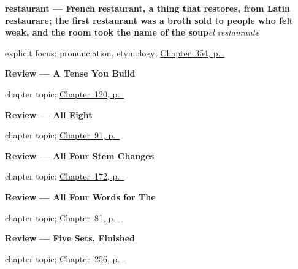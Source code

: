\noindent\begin{minipage}[t]{\linewidth}
\raggedright
\textbf{restaurant — French restaurant, a thing that restores, from Latin restaurare; the first restaurant was a broth sold to people who felt weak, and the room took the name of the soup}\enspace\emph{el restaurante}\par
\footnotesize explicit focus: pronunciation, etymology; \hyperref[ch:el-hotel-y-el-cine]{Chapter~354, p.~\pageref*{ch:el-hotel-y-el-cine}}
\end{minipage}\par\smallskip

\noindent\begin{minipage}[t]{\linewidth}
\raggedright
\textbf{Review --- A Tense You Build}\par
\footnotesize chapter topic; \hyperref[ch:review-perfect]{Chapter~120, p.~\pageref*{ch:review-perfect}}
\end{minipage}\par\smallskip

\noindent\begin{minipage}[t]{\linewidth}
\raggedright
\textbf{Review --- All Eight}\par
\footnotesize chapter topic; \hyperref[ch:review-object-complete]{Chapter~91, p.~\pageref*{ch:review-object-complete}}
\end{minipage}\par\smallskip

\noindent\begin{minipage}[t]{\linewidth}
\raggedright
\textbf{Review --- All Four Stem Changes}\par
\footnotesize chapter topic; \hyperref[ch:spanish-review-stem-changes]{Chapter~172, p.~\pageref*{ch:spanish-review-stem-changes}}
\end{minipage}\par\smallskip

\noindent\begin{minipage}[t]{\linewidth}
\raggedright
\textbf{Review --- All Four Words for The}\par
\footnotesize chapter topic; \hyperref[ch:review-articles]{Chapter~81, p.~\pageref*{ch:review-articles}}
\end{minipage}\par\smallskip

\noindent\begin{minipage}[t]{\linewidth}
\raggedright
\textbf{Review --- Five Sets, Finished}\par
\footnotesize chapter topic; \hyperref[ch:repaso-parejas]{Chapter~256, p.~\pageref*{ch:repaso-parejas}}
\end{minipage}\par\smallskip

